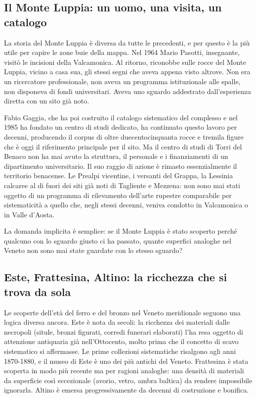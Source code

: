 \subsection{Il Monte Luppia: un uomo, una visita, un catalogo}

La storia del Monte Luppia è diversa da tutte le precedenti, e per questo è la più utile per capire le zone buie della mappa. Nel 1964 Mario Pasotti, insegnante, visitò le incisioni della Valcamonica. Al ritorno, riconobbe sulle rocce del Monte Luppia, vicino a casa sua, gli stessi segni che aveva appena visto altrove. Non era un ricercatore professionale, non aveva un programma istituzionale alle spalle, non disponeva di fondi universitari. Aveva uno sguardo addestrato dall'esperienza diretta con un sito già noto.

Fabio Gaggia, che ha poi costruito il catalogo sistematico del complesso e nel 1985 ha fondato un centro di studi dedicato, ha continuato questo lavoro per decenni, producendo il corpus di oltre duecentocinquanta rocce e tremila figure che è oggi il riferimento principale per il sito. Ma il centro di studi di Torri del Benaco non ha mai avuto la struttura, il personale e i finanziamenti di un dipartimento universitario. Il suo raggio di azione è rimasto essenzialmente il territorio benacense. Le Prealpi vicentine, i versanti del Grappa, la Lessinia calcaree al di fuori dei siti già noti di Tagliente e Mezzena: non sono mai stati oggetto di un programma di rilevamento dell'arte rupestre comparabile per sistematicità a quello che, negli stessi decenni, veniva condotto in Valcamonica o in Valle d'Aosta.

La domanda implicita è semplice: se il Monte Luppia è stato scoperto perché qualcuno con lo sguardo giusto ci ha passato, quante superfici analoghe nel Veneto non sono mai state guardate con lo stesso sguardo?

\subsection{Este, Frattesina, Altino: la ricchezza che si trova da sola}

Le scoperte dell'età del ferro e del bronzo nel Veneto meridionale seguono una logica diversa ancora. Este è nota da secoli: la ricchezza dei materiali dalle necropoli (situle, bronzi figurati, corredi funerari elaborati) l'ha resa oggetto di attenzione antiquaria già nell'Ottocento, molto prima che il concetto di scavo sistematico si affermasse. Le prime collezioni sistematiche risalgono agli anni 1870-1880, e il museo di Este è uno dei più antichi del Veneto. Frattesina è stata scoperta in modo più recente ma per ragioni analoghe: una densità di materiali da superficie così eccezionale (avorio, vetro, ambra baltica) da rendere impossibile ignorarla. Altino è emersa progressivamente da decenni di costruzione e bonifica.

